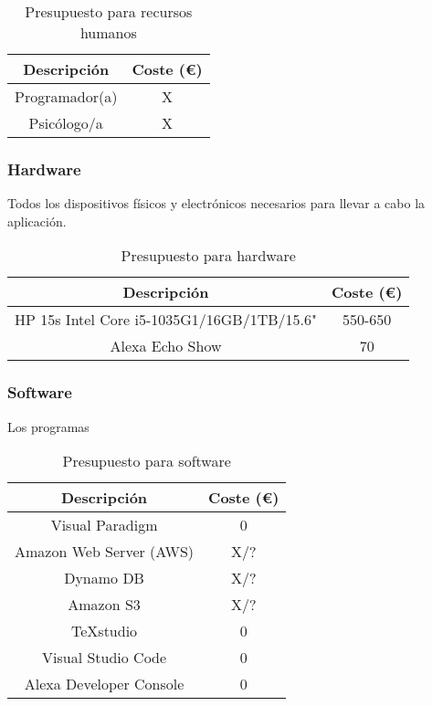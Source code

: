 \begin{table}[H]
    \centering
    \begin{tabular}{|c|c|}
    \hline
    \textbf{Descripción} & \textbf{Coste (€)}\\
    \hline
    Programador(a) & X \\
    \hline
    Psicólogo/a & X \\
    \hline
    \end{tabular}
    \caption{Presupuesto para recursos humanos}
    \label{tab:presupuesto-personal}
\end{table}

\subsubsection{Hardware}
Todos los dispositivos físicos y electrónicos necesarios para llevar a cabo la aplicación.

\begin{table}[H]
    \centering
    \begin{tabular}{|c|c|}
    \hline
    \textbf{Descripción} & \textbf{Coste (€)}\\
    \hline
    HP 15s Intel Core i5-1035G1/16GB/1TB/15.6" & 550-650 \\
    \hline
    Alexa Echo Show & 70 \\
    \hline
    \end{tabular}
    \caption{Presupuesto para hardware}
    \label{tab:presupuesto-hw}
\end{table}

\subsubsection{Software}
Los programas 

\begin{table}[H]
    \centering
    \begin{tabular}{|c|c|}
    \hline
    \textbf{Descripción} & \textbf{Coste (€)}\\
    \hline
    Visual Paradigm & 0 \\
    \hline
    Amazon Web Server (AWS) & X/? \\
    \hline
    Dynamo DB & X/? \\
    \hline
    Amazon S3 & X/? \\
    \hline
    TeXstudio & 0 \\
    \hline
    Visual Studio Code & 0 \\
    \hline
    Alexa Developer Console & 0 \\
    \hline
    \end{tabular}
    \caption{Presupuesto para software}
    \label{tab:presupuesto-sw}
\end{table}

